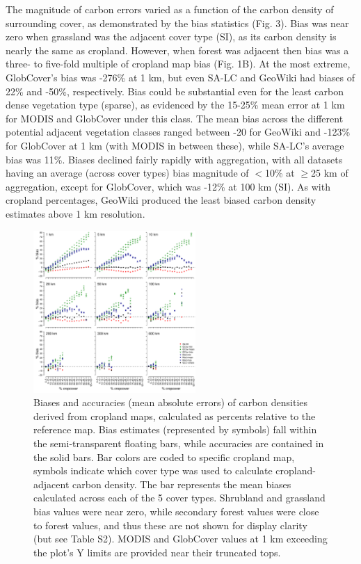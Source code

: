 \documentclass[a4paper]{article}
\begin{document}
The magnitude of carbon errors varied as a function of the carbon density of surrounding cover, as demonstrated by the bias statistics (Fig. 3). Bias was near zero when grassland was the adjacent cover type (SI), as its carbon density is nearly the same as cropland. However, when forest was adjacent then bias was a three- to five-fold multiple of cropland map bias (Fig. 1B). At the most extreme, GlobCover's bias was -276\% at 1 km, but even SA-LC and GeoWiki had biases of 22\% and -50\%, respectively. Bias could be substantial even for the least carbon dense vegetation type (sparse), as evidenced by the 15-25\% mean error at 1 km for MODIS and GlobCover under this class.  The mean bias across the different potential adjacent vegetation classes ranged between -20 for GeoWiki and -123\% for GlobCover at 1 km (with MODIS in between these), while SA-LC's average bias was 11\%.  Biases declined fairly rapidly with aggregation, with all datasets having an average (across cover types) bias magnitude of $<$10\% at $\geq$25 km of aggregation, except for GlobCover, which was -12\% at 100 km (SI).  As with cropland percentages, GeoWiki produced the least biased carbon density estimates above 1 km resolution. 

\begin{figure}[!h]
\centerline{\includegraphics[width=0.55\textwidth]{figures/figure3.pdf}}
\caption{Biases and accuracies (mean absolute errors) of carbon densities derived from cropland maps, calculated as percents relative to the reference map. Bias estimates (represented by symbols) fall within the semi-transparent floating bars, while accuracies are contained in the solid bars. Bar colors are coded to specific cropland map, symbols indicate which cover type was used to calculate cropland-adjacent carbon density. The bar represents the mean biases calculated across each of the 5 cover types. Shrubland and grassland bias values were near zero, while secondary forest values were close to forest values, and thus these are not shown for display clarity (but see Table S2). MODIS and GlobCover values at 1 km exceeding the plot's Y limits are provided near their truncated tops.}
\label{afoto}
\end{figure}
\end{document}
